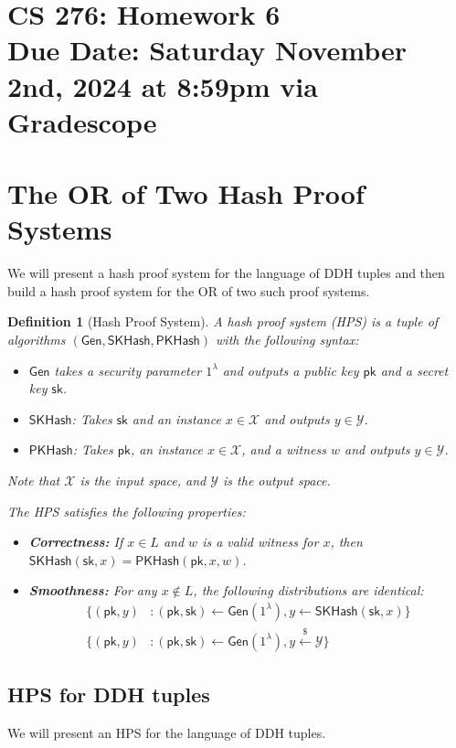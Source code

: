 \documentclass[11pt]{article}
\newtheorem{definition}[theorem]{Definition}
\numberwithin{equation}{section}
\newcommand{\cX}{\mathcal{X}}
\newcommand{\cY}{\mathcal{Y}}
\newcommand{\Gen}{\mathsf{Gen}}
\newcommand{\pk}{\mathsf{pk}}
\newcommand{\sk}{\mathsf{sk}}
\newcommand{\secp}{\lambda}
\newcommand{\getsr}{\stackrel{\$}{\gets}}
\newcommand{\duedate}{Saturday November 2nd, 2024 at 8:59pm via Gradescope}
\begin{document}
\section*{CS 276: Homework 6\\ {\small Due Date: \duedate} }

\section{The OR of Two Hash Proof Systems}
We will present a hash proof system for the language of DDH tuples and then build a hash proof system for the OR of two such proof systems.

\begin{definition}[Hash Proof System]
    A hash proof system (HPS) is a tuple of algorithms $(\Gen, \mathsf{SKHash}, \mathsf{PKHash})$ with the following syntax:
    \begin{itemize}
        \item $\Gen$ takes a security parameter $1^\secp$ and outputs a public key $\pk$ and a secret key $\sk$.
        \item $\mathsf{SKHash}$: Takes $\sk$ and an instance $x \in \cX$ and outputs $y \in \cY$.
        \item $\mathsf{PKHash}$: Takes $\pk$, an instance $x \in \cX$, and a witness $w$ and outputs $y \in \cY$.
    \end{itemize}
    Note that $\cX$ is the input space, and $\cY$ is the output space.
    
    The HPS satisfies the following properties:
    \begin{itemize}
        \item \textbf{Correctness:} If $x \in L$ and $w$ is a valid witness for $x$, then $\mathsf{SKHash}(\sk, x) = \mathsf{PKHash}(\pk, x, w)$.
        \item \textbf{Smoothness:} For any $x \notin L$, the following distributions are identical:
        \begin{align*}
            \{(\pk, y) &: (\pk, \sk) \gets \Gen(1^\secp), y \gets \mathsf{SKHash}(\sk, x)\}\\
            \{(\pk, y) &: (\pk, \sk) \gets \Gen(1^\secp), y \getsr \mathcal{Y}\}
        \end{align*}
    \end{itemize}
\end{definition}

\subsection{HPS for DDH tuples}
We will present an HPS for the language of DDH tuples.
\end{document}
